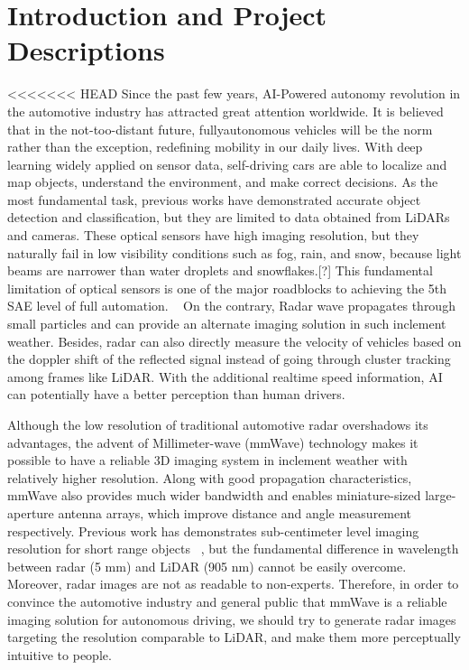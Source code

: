 \section{Introduction and Project Descriptions} \label{introduction}


<<<<<<< HEAD
Since the past few years, AI-Powered autonomy revolution in the automotive industry has attracted great attention worldwide. It is believed that in the not-too-distant future, fullyautonomous vehicles will be the norm rather than the exception, redefining mobility in our daily lives. With deep learning widely applied on sensor data, self-driving cars are able to localize and map objects, understand the environment, and make correct decisions. As the most fundamental task, previous works have demonstrated accurate object detection and classification, but they are limited to data obtained from LiDARs and cameras. These optical sensors have high imaging resolution, but they naturally fail in low visibility conditions such as fog, rain, and snow, because light beams are narrower than water droplets and snowflakes.[?] This fundamental limitation of optical sensors is one of the major roadblocks to achieving the 5th SAE level of full automation. ~\cite{SAE} On the contrary, Radar wave propagates through small particles and can provide an alternate imaging solution in such inclement weather. Besides, radar can also directly measure the velocity of vehicles based on the doppler shift of the reflected signal instead of going through cluster tracking among frames like LiDAR. With the additional realtime speed information, AI can potentially have a better perception than human drivers.

Although the low resolution of traditional automotive radar overshadows its advantages, the advent of Millimeter-wave (mmWave) technology makes it possible to have a reliable 3D imaging system in inclement weather with relatively higher resolution. Along with good propagation characteristics, mmWave also provides much wider bandwidth and enables miniature-sized large-aperture antenna arrays, which improve distance and angle measurement respectively. Previous work has demonstrates sub-centimeter level imaging resolution for short range objects ~\cite{mmWave_SAR}, but the fundamental difference in wavelength between radar (5 mm) and LiDAR (905 nm) cannot be easily overcome. Moreover, radar images are not as readable to non-experts. Therefore, in order to convince the automotive industry and general public that mmWave is a reliable imaging solution for autonomous driving, we should try to generate radar images targeting the resolution comparable to LiDAR, and make them more perceptually intuitive to people. 

